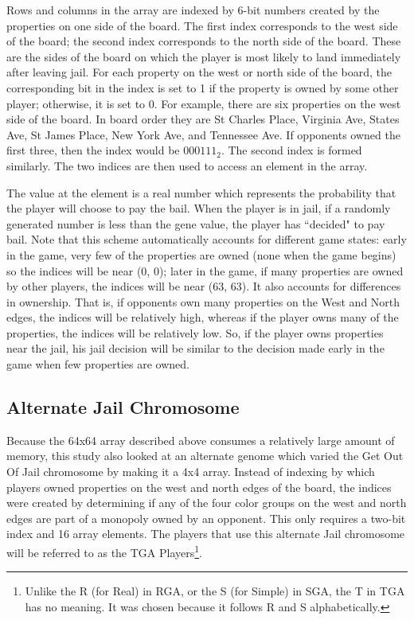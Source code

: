 Rows and columns in the array are indexed by 6-bit numbers created by the
properties on one side of the board. The first index corresponds to the west
side of the board; the second index corresponds to the north side of the board.
These are the sides of the board on which the player is most likely to land
immediately after leaving jail. For each property on the west or north side of
the board, the corresponding bit in the index is set to 1 if the property is
owned by some other player; otherwise, it is set to 0. For example, there are
six properties on the west side of the board. In board order they are St Charles
Place, Virginia Ave, States Ave, St James Place, New York Ave, and Tennessee
Ave. If opponents owned the first three, then the index would be $000111_2$. The
second index is formed similarly. The two indices are then used to access an
element in the array.

The value at the element is a real number which represents the probability that the
player will choose to pay the bail. When the player is in jail, if a randomly
generated number is less than the gene value, the player has ``decided" to pay
bail. Note that this scheme automatically accounts for different game states:
early in the game, very few of the properties are owned (none when the game
begins) so the indices will be near (0, 0); later in the game, if many
properties are owned by other players, the indices will be near (63, 63). It
also accounts for differences in ownership. That is, if opponents own many
properties on the West and North edges, the indices will be relatively high,
whereas if the player owns many of the properties, the indices will be
relatively low. So, if the player owns properties near the jail, his jail
decision will be similar to the decision made early in the game when few
properties are owned.

\subsection{Alternate Jail Chromosome} \label{5_altjail}

Because the 64x64 array described above consumes a relatively large amount of
memory, this study also looked at an alternate genome which varied the Get Out
Of Jail chromosome by making it a 4x4 array. Instead of indexing by which
players owned properties on the west and north edges of the board, the
indices were created by determining if any of the four color groups on the
west and north edges are part of a monopoly owned by an opponent. This only
requires a two-bit index and 16 array elements. The players that use this
alternate Jail chromosome will be referred to as the TGA Players\footnote{Unlike
the R (for Real) in RGA, or the S (for Simple) in SGA, the T in TGA has no
meaning. It was chosen because it follows R and S alphabetically.}.

